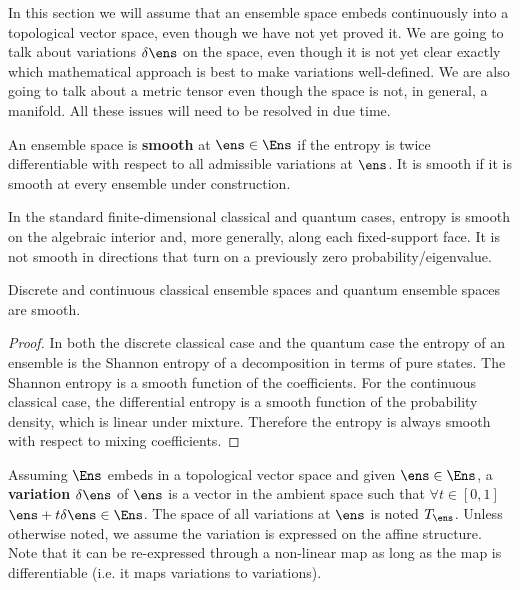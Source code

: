 \begin{mathSection}
\begin{remark}
	In this section we will assume that an ensemble space embeds continuously into a topological vector space, even though we have not yet proved it. We are going to talk about variations $\delta \ens$ on the space, even though it is not yet clear exactly which mathematical approach is best to make variations well-defined. We are also going to talk about a metric tensor even though the space is not, in general, a manifold. All these issues will need to be resolved in due time.
\end{remark}
	
\begin{defn}
	An ensemble space is \textbf{smooth} at $\ens \in \Ens$ if the entropy is twice differentiable with respect to all admissible variations at $\ens$. It is smooth if it is smooth at every ensemble under construction.
\end{defn}

\begin{remark}
	In the standard finite-dimensional classical and quantum cases, entropy is smooth on the algebraic interior and, more generally, along each fixed-support face. It is not smooth in directions that turn on a previously zero probability/eigenvalue.
\end{remark}

\begin{prop}
	Discrete and continuous classical ensemble spaces and quantum ensemble spaces are smooth.
\end{prop}

\begin{proof}
	In both the discrete classical case and the quantum case the entropy of an ensemble is the Shannon entropy of a decomposition in terms of pure states. The Shannon entropy is a smooth function of the coefficients. For the continuous classical case, the differential entropy is a smooth function of the probability density, which is linear under mixture. Therefore the entropy is always smooth with respect to mixing coefficients.
\end{proof}

\begin{defn}
	Assuming $\Ens$ embeds in a topological vector space and given $\ens \in \Ens$, a \textbf{variation} $\delta \ens$ of $\ens$ is a vector in the ambient space such that $\forall t \in [0,1]$ $\ens + t \delta \ens \in \Ens$. The space of all variations at $\ens$ is noted $T_{\ens}$. Unless otherwise noted, we assume the variation is expressed on the affine structure. Note that it can be re-expressed through a non-linear map as long as the map is differentiable (i.e. it maps variations to variations).
\end{defn}


\end{mathSection}
